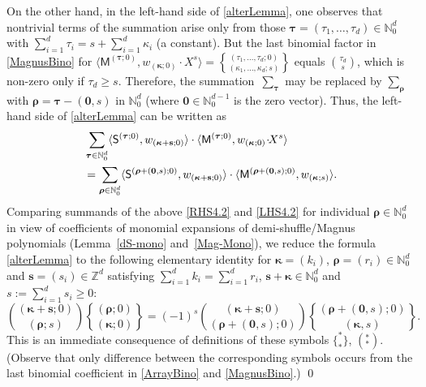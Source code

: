 \documentclass[ALCO,Unicode,published]{cedram}
\DeclareRobustCommand{\magnus}{\genfrac\{\}{0pt}{}}
\def\MM{{\mathsf{M}}}
\def\SS{{\mathsf{S}}}
\def\bs{{\mathbf{s}}}
\def\bkappa{{\boldsymbol \kappa}}
\def\btau{{\boldsymbol \tau}}
\def\brho{{\boldsymbol \rho}}
\def\lp{\langle}
\def\rp{\rangle}
\def\N{{\mathbb N}}
\def\Z{{\mathbb Z}}
\def\bkappa{{\boldsymbol \kappa}}
\def\brho{{\boldsymbol \rho}}
\begin{document}
\begin{Note}
On the other hand, in the left-hand side of  \eqref{alterLemma},
one observes that nontrivial terms of the summation arise
only from those $\btau=(\tau_1,\dots,\tau_d)\in\N_0^d$ with
$\sum_{i=1}^d \tau_i=s+\sum_{i=1}^d \kappa_i$ (a constant). 
But the last binomial factor in \eqref{MagnusBino} for
$ \lp\MM^{(\btau;0)}, w_{(\bkappa;0)}\!\cdot\!\! X^s\rp
=\magnus{(\tau_1,\dots,\tau_d;0)}{(\kappa_1,\dots,\kappa_d;s)}
$
equals $\binom{\tau_d}{s}$, which is non-zero only if
$\tau_d\ge s$.
Therefore, 
the summation~$\sum_\btau$ may be replaced by 
$\sum_\brho$ with $\brho=\btau-(\mathbf{0},s)$
in $\N_0^d$ (where $\mathbf{0}\in\N_0^{d-1}$ is the zero vector).
Thus,
the left-hand side of \eqref{alterLemma} can be written as
\begin{align}
\label{LHS4.2}
&\sum_{\btau\in\N_0^d} 
\lp\SS^{(\btau;0)},w_{(\bkappa+\bs;0)} \rp \cdot 
\lp\MM^{(\btau;0)}, w_{(\bkappa;0)}\!\cdot\!\! X^s\rp \\
&=
\sum_{\brho\in\N_0^d} 
\lp\SS^{(\brho+(\mathbf{0},s);0)},w_{(\bkappa+\bs;0)} \rp \cdot 
\lp\MM^{(\brho+(\mathbf{0},s);0)}, w_{(\bkappa;s)} \rp.
\notag
\end{align}
Comparing summands of the above \eqref{RHS4.2} and \eqref{LHS4.2} for 
individual $\brho\in\N_0^d$ in view of coefficients of 
monomial expansions of demi-shuffle/Magnus polynomials 
(Lemma~\ref{dS-mono} and~\eqref{Mag-Mono}), we reduce 
the formula \eqref{alterLemma} to the following elementary identity
for $\bkappa=(k_i)$, $\brho=(r_i)\in\N_0^d$ and $\bs=(s_i)\in\Z^d$
satisfying
$\sum_{i=1}^d k_i=\sum_{i=1}^d r_i$, $\bs+\bkappa\in \N_0^d$
and $s:=\sum_{i=1}^d s_i\ge 0$:
\begin{equation}
\binom{(\bkappa+\bs;0)}{(\brho;s)}
\magnus{(\brho;0)}{(\bkappa;0)}
=
(-1)^s
\binom{(\bkappa+\bs;0)}{(\brho+(\mathbf{0},s);0)}
\magnus{(\brho+(\mathbf{0},s);0)}{(\bkappa,s)}.
\end{equation} 
This is an immediate consequence of definitions
of these symbols $\{^*_* \}$, $(^*_*)$.
(Observe that only difference between the corresponding symbols
occurs from the last binomial coefficient in  \eqref{ArrayBino}
and \eqref{MagnusBino}.)
\qed
\end{Note}
\end{document}
